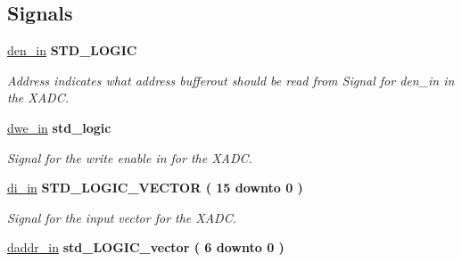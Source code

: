 \subsection*{Signals}
 \begin{DoxyCompactItemize}
\item 
\hypertarget{classADC__TOP_1_1Behavioral_ab48f33ef761b1b52e2b08c1d8ef76334}{\hyperlink{classADC__TOP_1_1Behavioral_ab48f33ef761b1b52e2b08c1d8ef76334}{den\-\_\-in} {\bfseries \textcolor{comment}{S\-T\-D\-\_\-\-L\-O\-G\-I\-C}\textcolor{vhdlchar}{ }} }\label{classADC__TOP_1_1Behavioral_ab48f33ef761b1b52e2b08c1d8ef76334}

\begin{DoxyCompactList}\small\item\em Address indicates what address bufferout should be read from Signal for den\-\_\-in in the X\-A\-D\-C. \end{DoxyCompactList}\item 
\hypertarget{classADC__TOP_1_1Behavioral_afeaa67943e27d8c3ee9651159bd9193d}{\hyperlink{classADC__TOP_1_1Behavioral_afeaa67943e27d8c3ee9651159bd9193d}{dwe\-\_\-in} {\bfseries \textcolor{comment}{std\-\_\-logic}\textcolor{vhdlchar}{ }} }\label{classADC__TOP_1_1Behavioral_afeaa67943e27d8c3ee9651159bd9193d}

\begin{DoxyCompactList}\small\item\em Signal for the write enable in for the X\-A\-D\-C. \end{DoxyCompactList}\item 
\hypertarget{classADC__TOP_1_1Behavioral_a6116bc00f8788e5cc6bc5deb069fdc53}{\hyperlink{classADC__TOP_1_1Behavioral_a6116bc00f8788e5cc6bc5deb069fdc53}{di\-\_\-in} {\bfseries \textcolor{comment}{S\-T\-D\-\_\-\-L\-O\-G\-I\-C\-\_\-\-V\-E\-C\-T\-O\-R}\textcolor{vhdlchar}{ }\textcolor{vhdlchar}{(}\textcolor{vhdlchar}{ }\textcolor{vhdlchar}{ } \textcolor{vhdldigit}{15} \textcolor{vhdlchar}{ }\textcolor{vhdlchar}{ }\textcolor{vhdlchar}{ }\textcolor{vhdlkeyword}{downto}\textcolor{vhdlchar}{ }\textcolor{vhdlchar}{ }\textcolor{vhdlchar}{ } \textcolor{vhdldigit}{0} \textcolor{vhdlchar}{ }\textcolor{vhdlchar}{)}\textcolor{vhdlchar}{ }} }\label{classADC__TOP_1_1Behavioral_a6116bc00f8788e5cc6bc5deb069fdc53}

\begin{DoxyCompactList}\small\item\em Signal for the input vector for the X\-A\-D\-C. \end{DoxyCompactList}\item 
\hypertarget{classADC__TOP_1_1Behavioral_a72126e522b97fa2b659a65d687081a41}{\hyperlink{classADC__TOP_1_1Behavioral_a72126e522b97fa2b659a65d687081a41}{daddr\-\_\-in} {\bfseries \textcolor{comment}{std\-\_\-\-L\-O\-G\-I\-C\-\_\-vector}\textcolor{vhdlchar}{ }\textcolor{vhdlchar}{(}\textcolor{vhdlchar}{ }\textcolor{vhdlchar}{ } \textcolor{vhdldigit}{6} \textcolor{vhdlchar}{ }\textcolor{vhdlchar}{ }\textcolor{vhdlchar}{ }\textcolor{vhdlkeyword}{downto}\textcolor{vhdlchar}{ }\textcolor{vhdlchar}{ }\textcolor{vhdlchar}{ } \textcolor{vhdldigit}{0} \textcolor{vhdlchar}{ }\textcolor{vhdlchar}{)}\textcolor{vhdlchar}{ }} }\label{classADC__TOP_1_1Behavioral_a72126e522b97fa2b659a65d687081a41}


\end{DoxyCompactItemize}
